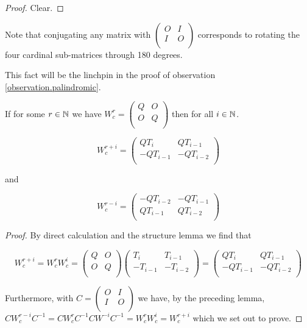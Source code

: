 \begin{proof}
  Clear.
\end{proof}

Note that conjugating any matrix with
$\left(\begin{smallmatrix} O & I \\ I & O \\\end{smallmatrix}\right)$ 
corresponds to rotating the four cardinal sub-matrices through 180 degrees.

This fact will be the linchpin in the proof of observation
\ref{observation.palindromic}.

\begin{lemma}\label{mirror}
  If for some $r\in\mathbb{N}$ we have $W_{c}^{r} = \left(\begin{smallmatrix} Q & O \\ O & Q \\\end{smallmatrix}\right)$ then for all $i\in\mathbb{N}$.

  \[
  W_{c}^{r+i} = \left(\begin{array}{cc} QT_{i} & QT_{i-1} \\ -QT_{i-1} & -QT_{i-2} \\\end{array}\right)
  \]

  and

  \[
  W_{c}^{r-i} = \left(\begin{array}{cc} -QT_{i-2} & -QT_{i-1} \\ QT_{i-1} & QT_{i-2} \\\end{array}\right)
  \]
\end{lemma}

\begin{proof}
  By direct calculation and the structure lemma we find that

  \[
  W_{c}^{r+i}
  =
  W_{c}^{r}W_{c}^{i}
  =
  \left(
  \begin{array}{cc}
    Q & O \\
    O & Q \\
  \end{array}
  \right)
  \left(
  \begin{array}{cc}
     T_{i} &  T_{i-1}  \\
    -T_{i-1} & -T_{i-2} \\
  \end{array}
  \right)
  =
  \left(
  \begin{array}{cc}
     QT_{i} &  QT_{i-1}  \\
    -QT_{i-1} & -QT_{i-2} \\
  \end{array}
  \right)
  \]

  Furthermore, with $C=\left(\begin{smallmatrix} O & I \\ I & O \\\end{smallmatrix}\right)$
  we have, by the preceding lemma,
  $CW_{c}^{r-i}C^{-1}=CW_{c}^{r}C^{-1}CW^{-i}C^{-1}=W_{c}^{r}W_{c}^{i}=W_{c}^{r+i}$
  which we set out to prove.
\end{proof}

